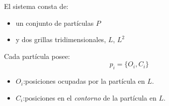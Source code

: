 \documentclass[spanish,unknownkeysallowed,10pt]{beamer}
\begin{document}
\begin{frame}
El sistema consta de:
\begin{itemize}
\item un conjunto de partículas $P$
\item y dos grillas tridimensionales, $L$, $L^{2}$
\end{itemize}


Cada partícula posee:
\begin{equation*}
  p_{i} = \{O_{i}, C_{i}\}
\end{equation*}

\begin{itemize}
\item $O_{i}$:posiciones ocupadas por la part\'icula en $L$.

\item $C_{i}$:posiciones en el {\em contorno} de la part\'icula en $L$.
\end{itemize}





\end{frame}
\end{document}
